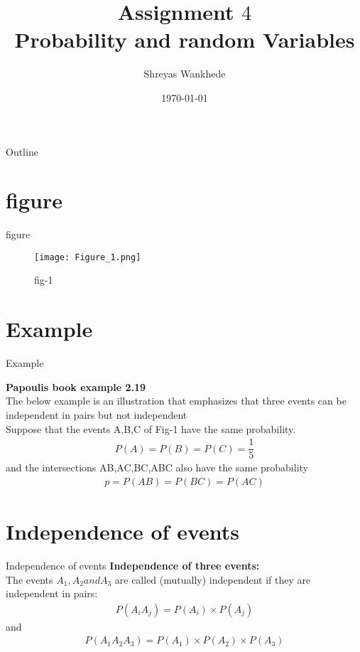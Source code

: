 \documentclass{beamer}
\title{Assignment $4$\\ Probability and random Variables}
\institute{Indian Institute of Technology Hyderabad}
\author{Shreyas Wankhede}
\date{\today}
\begin{document}
\begin{frame}
\titlepage 
\end{frame}

\logo{}


\begin{frame}{Outline}
    \tableofcontents
\end{frame}



\section{figure}
\begin{frame}{figure}
\begin{figure}
  \texttt{[image: Figure\_1.png]}
  \caption{fig-1}
  \label{fiure-1}
\end{figure}
\end{frame}
\section{Example}
\begin{frame}{Example}

\textbf{Papoulis book example 2.19}\\\vspace{5mm}
The below example is an illustration that emphasizes that three events can be independent in pairs but not independent\\\vspace{3mm}
Suppose that the events A,B,C of Fig-1 have the same probability.\\
\begin{align}
    P(A)=P(B)=P(C)=\dfrac{1}{5}\nonumber
\end{align}
and the intersections AB,AC,BC,ABC also have the same probability
\begin{align}
    p=P(AB)=P(BC)=P(AC)\nonumber
\end{align}



\end{frame}

\section{Independence of events}
\begin{frame}{Independence of events}
 \textbf{Independence of three events:}\\
 The events $A_1, A_2 and A_3$ are called (mutually) independent if they are independent in pairs:\\
 \begin{align}
     P(A_iA_j)=P(A_i)\times P(A_j)\label{eq:1}
 \end{align}
 and
 \begin{align}
     P(A_1A_2A_3)=P(A_1)\times P(A_2)\times P(A_3)\label{eq:2}
 \end{align}
\end{frame}
\end{document}
